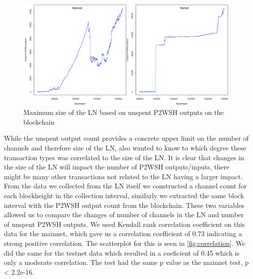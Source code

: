 \begin{figure}[h]
    \centering
    \includegraphics[width=16cm]{figures/graphs/ln_size_bc.png}
    \caption{Maximum size of the LN based on unspent P2WSH outputs on the blockchain}
    \label{fig:ln_size}
\end{figure}
While the unspent output count provides a concrete upper limit on the number of channels and therefore size of the LN, also wanted to know to which degree these transaction types was correlated to the size of the LN. It is clear that changes in the size of the LN will impact the number of P2WSH outputs/inputs, there might be many other transactions not related to the LN having a larger impact. From the data we collected from the LN itself we constructed a channel count for each blockheight in the collection interval, similarly we extracted the same block interval with the P2WSH output count from the blockchain. These two variables allowed us to compare the changes of number of channels in the LN and number of unspent P2WSH outputs. We used Kendall rank correlation coefficient  on this data for the mainnet, which gave us a correlation coefficient of 0.73 indicating a strong positive correlation. The scatterplot for this is seen in \cref{fig:correlation}.
We did the same for the testnet data which resulted in a coeficient of 0.45 which is only a moderate correlation. The test had the same p value as the mainnet test, p < 2.2e-16.


